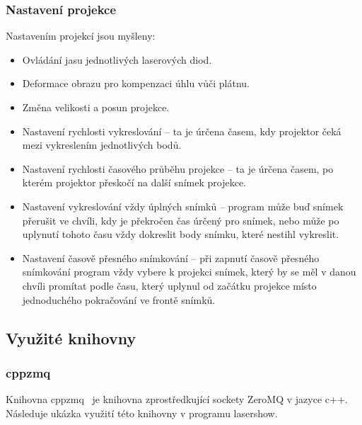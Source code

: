 \subsubsection{Nastavení projekce}
Nastavením projekcí jsou myšleny:
\begin{itemize}
\item Ovládání jasu jednotlivých laserových diod.
\item Deformace obrazu pro kompenzaci úhlu vůči plátnu.
\item Změna velikosti a posun projekce. 
\item Nastavení rychlosti vykreslování -- ta je úrčena časem, kdy projektor čeká mezi vykreslením jednotlivých bodů.
\item Nastavení rychlosti časového průběhu projekce -- ta je úrčena časem, po kterém projektor přeskočí na další snímek projekce.
\item Nastavení vykreslování vždy úplných snímků -- program může buď snímek přerušit ve chvíli, kdy je překročen čas úrčený pro snímek, nebo může po uplynutí tohoto času vždy dokreslit body snímku, které nestihl vykreslit.
\item Nastavení časově přesného snímkování -- při zapnutí časově přesného snímkování program vždy vybere k projekci snímek, který by se měl v danou chvíli promítat podle času, který uplynul od začátku projekce místo jednoduchého pokračování ve frontě snímků.
\end{itemize}



\subsection{Využité knihovny}
\subsubsection{cppzmq}\label{sec:ls_cppzmq}
Knihovna cppzmq~\cite{cppzmq} je knihovna zprostředkující sockety ZeroMQ v jazyce c++. Následuje ukázka využití této knihovny v programu lasershow.
\inputminted[frame=lines,fontsize=\footnotesize{}, linenos, breaklines]{cpp}{code_examples/zmq_server.cpp}

